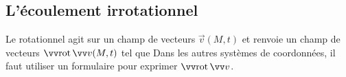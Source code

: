 \documentclass[12pt,fancy]{cours}
\begin{document}

\subsection{L'écoulement irrotationnel}

 Le rotationnel agit sur un champ de vecteurs $\Vec{v}(M,t)$ et renvoie un champ de vecteurs $\Rot{\Vec{v}}(M,t)$ tel que
Dans les autres systèmes de coordonnées, il faut utiliser un formulaire pour exprimer $\rot \Vec{v}$.
\end{document}
